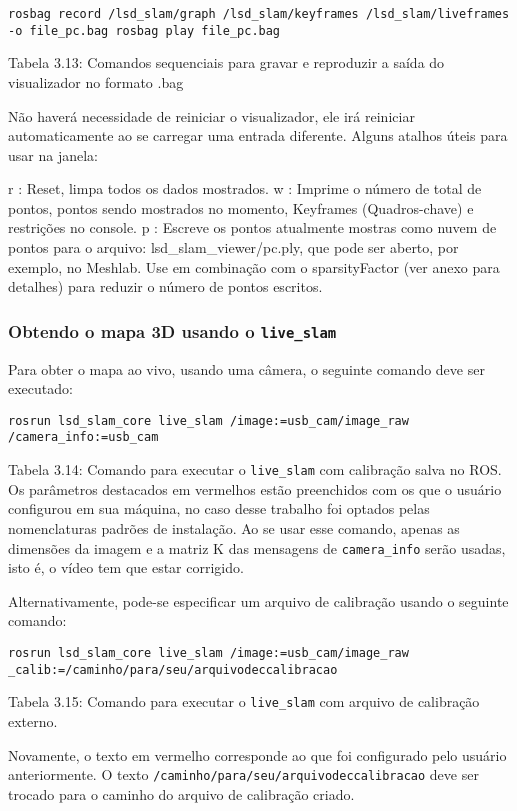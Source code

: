 \texttt{rosbag record /lsd\_slam/graph /lsd\_slam/keyframes /lsd\_slam/liveframes -o file\_pc.bag
rosbag play file\_pc.bag}

Tabela 3.13: Comandos sequenciais para gravar e reproduzir a saída do visualizador no formato .bag

Não haverá necessidade de reiniciar o visualizador, ele irá reiniciar automaticamente ao se carregar uma entrada diferente. Alguns atalhos úteis para usar na janela:

r : Reset, limpa todos os dados mostrados.
w : Imprime o número de total de pontos, pontos sendo mostrados no momento, Keyframes (Quadros-chave) e restrições no console.
p : Escreve os pontos atualmente mostras como nuvem de pontos para o arquivo: lsd\_slam\_viewer/pc.ply, que pode ser aberto, por exemplo, no Meshlab. Use  em combinação com o sparsityFactor (ver anexo para detalhes) para reduzir o número de pontos escritos.

\subsubsection{Obtendo o mapa 3D usando o \texttt{live\_slam}}

Para obter o mapa ao vivo, usando uma câmera, o seguinte comando deve ser executado:

\texttt{rosrun lsd\_slam\_core live\_slam /image:=usb\_cam/image\_raw /camera\_info:=usb\_cam}

Tabela 3.14: Comando para executar o \texttt{live\_slam} com calibração salva no ROS.
Os parâmetros destacados em vermelhos estão preenchidos com os que o usuário configurou em sua máquina, no caso desse trabalho foi optados pelas nomenclaturas padrões de instalação. Ao se usar esse comando, apenas as dimensões da imagem e a matriz K das mensagens de \texttt{camera\_info} serão usadas, isto é, o vídeo tem que estar corrigido.

Alternativamente, pode-se especificar um arquivo de calibração usando o seguinte comando:

\texttt{rosrun lsd\_slam\_core live\_slam /image:=usb\_cam/image\_raw \_calib:=/caminho/para/seu/arquivodeccalibracao}

Tabela 3.15: Comando para executar o \texttt{live\_slam} com arquivo de calibração externo.

Novamente, o texto em vermelho corresponde ao que foi configurado pelo usuário anteriormente. O texto \texttt{/caminho/para/seu/arquivodeccalibracao} deve ser trocado para o caminho do arquivo de calibração criado.

